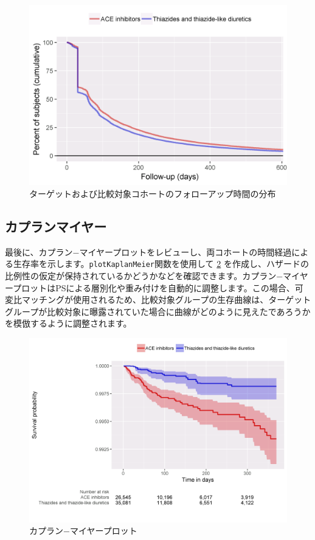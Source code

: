 \documentclass[
  11pt]{book}
\theoremstyle{definition}
\theoremstyle{definition}
\theoremstyle{definition}
\theoremstyle{definition}
\theoremstyle{remark}
\begin{document}
\begin{figure}

{\centering \includegraphics[width=0.8\linewidth]{images/PopulationLevelEstimation/followUp} 

}

\caption{ターゲットおよび比較対象コホートのフォローアップ時間の分布}\label{fig:followUp}
\end{figure}

\subsection{カプランマイヤー}\label{ux30abux30d7ux30e9ux30f3ux30deux30a4ux30e4ux30fc}

最後に、カプラン−マイヤープロットをレビューし、両コホートの時間経過による生存率を示します。\texttt{plotKaplanMeier}関数を使用して \ref{fig:kmPlot} を作成し、ハザードの比例性の仮定が保持されているかどうかなどを確認できます。カプラン−マイヤープロットはPSによる層別化や重み付けを自動的に調整します。この場合、可変比マッチングが使用されるため、比較対象グループの生存曲線は、ターゲットグループが比較対象に曝露されていた場合に曲線がどのように見えたであろうかを模倣するように調整されます。  

\begin{figure}

{\centering \includegraphics[width=1\linewidth]{images/PopulationLevelEstimation/kmPlot} 

}

\caption{カプラン−マイヤープロット}\label{fig:kmPlot}
\end{figure}
\end{document}
